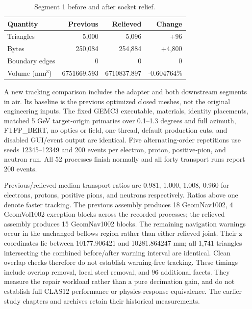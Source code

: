 \begin{table}[htbp]
\centering
\caption{Segment 1 before and after socket relief.}
\label{tab:downstream-joints-mesh}
\setlength{\tabcolsep}{9pt}
\begin{tabular}{lrrr}
\toprule
Quantity & Previous & Relieved & Change \\
\midrule
Triangles & 5,000 & 5,096 & +96 \\
Bytes & 250,084 & 254,884 & +4,800 \\
Boundary edges & 0 & 0 & 0 \\
Volume (mm$^3$) & 6751669.593 & 6710837.897 & -0.604764\% \\
\bottomrule
\end{tabular}
\end{table}

A new tracking comparison includes the adapter and both downstream segments in air. Its baseline is the
previous optimized closed meshes, not the original engineering inputs. The fixed GEMC3 executable,
materials, identity placements, matched 5 GeV target-origin primaries over 0.1--1.3 degrees and full
azimuth, FTFP\_BERT, no optics or field, one thread, default production cuts, and disabled GUI/event output
are identical. Five alternating-order repetitions use seeds 12345--12349 and 200 events per electron,
proton, positive-pion, and neutron run. All 52 processes finish normally and all forty transport runs report
200 events.

Previous/relieved median transport ratios are 0.981, 1.000, 1.008, 0.960 for electrons, protons, positive
pions, and neutrons respectively. Ratios above one denote faster tracking. The previous assembly produces 18
GeomNav1002, 4 GeomVol1002 exception blocks across the recorded processes; the relieved assembly produces 15
GeomNav1002 blocks. The remaining navigation warnings occur in the unchanged bellows region rather than
either relieved joint. Their z coordinates lie between 10177.906421 and 10281.864247 mm; all 1,741 triangles
intersecting the combined before/after warning interval are identical. Clean overlap checks therefore do not
establish warning-free tracking. These timings include overlap removal, local steel removal, and 96
additional facets. They measure the repair workload rather than a pure decimation gain, and do not establish
full CLAS12 performance or physics-response equivalence. The earlier study chapters and archives retain
their historical measurements.

